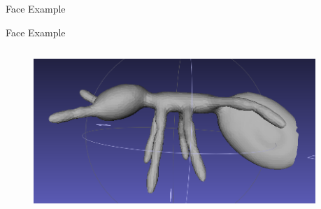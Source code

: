 \documentclass{beamer}
\begin{document}
\begin{frame}{Face Example}
\end{frame}


\begin{frame}{Face Example}

\begin{columns}
\begin{column}[T]{5cm}
\begin{figure}[t]
    \includegraphics[width=\textwidth]{bug.png}
\end{figure}
\end{column}

\begin{column}[T]{5cm}

\end{column}
\end{columns}

\end{frame}
\end{document}
